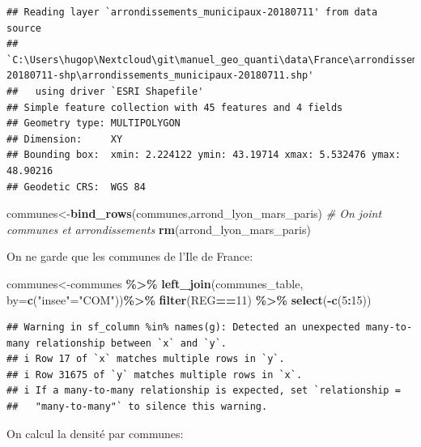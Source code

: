 \documentclass[
]{book}
\newenvironment{Shaded}{\begin{snugshade}}{\end{snugshade}}
\newcommand{\AttributeTok}[1]{\textcolor[rgb]{0.13,0.29,0.53}{#1}}
\newcommand{\CommentTok}[1]{\textcolor[rgb]{0.56,0.35,0.01}{\textit{#1}}}
\newcommand{\DecValTok}[1]{\textcolor[rgb]{0.00,0.00,0.81}{#1}}
\newcommand{\FunctionTok}[1]{\textcolor[rgb]{0.13,0.29,0.53}{\textbf{#1}}}
\newcommand{\NormalTok}[1]{#1}
\newcommand{\OtherTok}[1]{\textcolor[rgb]{0.56,0.35,0.01}{#1}}
\newcommand{\SpecialCharTok}[1]{\textcolor[rgb]{0.81,0.36,0.00}{\textbf{#1}}}
\newcommand{\StringTok}[1]{\textcolor[rgb]{0.31,0.60,0.02}{#1}}
\begin{document}
\begin{verbatim}
## Reading layer `arrondissements_municipaux-20180711' from data source 
##   `C:\Users\hugop\Nextcloud\git\manuel_geo_quanti\data\France\arrondissements_municipaux-20180711-shp\arrondissements_municipaux-20180711.shp' 
##   using driver `ESRI Shapefile'
## Simple feature collection with 45 features and 4 fields
## Geometry type: MULTIPOLYGON
## Dimension:     XY
## Bounding box:  xmin: 2.224122 ymin: 43.19714 xmax: 5.532476 ymax: 48.90216
## Geodetic CRS:  WGS 84
\end{verbatim}

\begin{Shaded}
\begin{Highlighting}[]
\NormalTok{communes}\OtherTok{\textless{}{-}}\FunctionTok{bind\_rows}\NormalTok{(communes,arrond\_lyon\_mars\_paris) }\CommentTok{\# On joint communes et arrondissements}
\FunctionTok{rm}\NormalTok{(arrond\_lyon\_mars\_paris)}
\end{Highlighting}
\end{Shaded}

On ne garde que les communes de l'Ile de France:

\begin{Shaded}
\begin{Highlighting}[]
\NormalTok{communes}\OtherTok{\textless{}{-}}\NormalTok{communes }\SpecialCharTok{\%\textgreater{}\%}
  \FunctionTok{left\_join}\NormalTok{(communes\_table, }\AttributeTok{by=}\FunctionTok{c}\NormalTok{(}\StringTok{"insee"}\OtherTok{=}\StringTok{"COM"}\NormalTok{))}\SpecialCharTok{\%\textgreater{}\%}
  \FunctionTok{filter}\NormalTok{(REG}\SpecialCharTok{==}\DecValTok{11}\NormalTok{) }\SpecialCharTok{\%\textgreater{}\%}
  \FunctionTok{select}\NormalTok{(}\SpecialCharTok{{-}}\FunctionTok{c}\NormalTok{(}\DecValTok{5}\SpecialCharTok{:}\DecValTok{15}\NormalTok{))}
\end{Highlighting}
\end{Shaded}

\begin{verbatim}
## Warning in sf_column %in% names(g): Detected an unexpected many-to-many relationship between `x` and `y`.
## i Row 17 of `x` matches multiple rows in `y`.
## i Row 31675 of `y` matches multiple rows in `x`.
## i If a many-to-many relationship is expected, set `relationship =
##   "many-to-many"` to silence this warning.
\end{verbatim}

On calcul la densité par communes:
\end{document}
